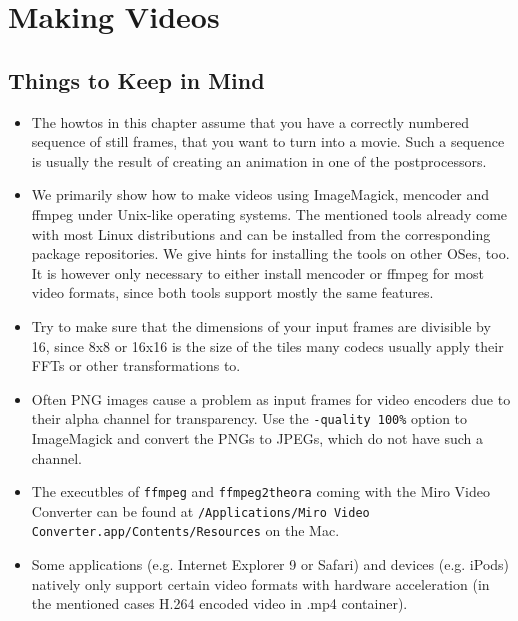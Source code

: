 \chapter{Making Videos}

\section{Things to Keep in Mind}

\begin{itemize}
\item The  howtos in this  chapter assume that  you have a  correctly numbered
sequence of still frames, that you want  to turn into a movie. Such a sequence
is usually the result of creating an animation in one of the postprocessors.

\item We  primarily show  how to make  videos using ImageMagick,  mencoder and
ffmpeg  under Unix-like operating  systems. The  mentioned tools  already come
with  most Linux  distributions and  can be  installed from  the corresponding
package repositories.  We give hints for  installing the tools  on other OSes,
too.  It  is however only necessary  to either install mencoder  or ffmpeg for
most video formats, since both tools support mostly the same features.

\item Try to make sure that  the dimensions of your input frames are divisible
by 16, since 8x8  or 16x16 is the size of the  tiles many codecs usually apply
their FFTs or other transformations to.

\item Often PNG images cause a  problem as input frames for video encoders due
to  their alpha  channel  for transparency.  Use  the \texttt{-quality  100\%}
option to ImageMagick and convert the PNGs  to JPEGs, which do not have such a
channel.

\item The executbles of \texttt{ffmpeg} and \texttt{ffmpeg2theora} coming with
the  Miro Video  Converter can  be found  at  \texttt{/Applications/Miro Video
Converter.app/Contents/Resources} on the Mac.

\item  Some applications  (e.g. Internet  Explorer  9 or  Safari) and  devices
(e.g.  iPods)  natively  only  support  certain video  formats  with  hardware
acceleration (in the mentioned cases H.264 encoded video in .mp4 container).
\end{itemize}

